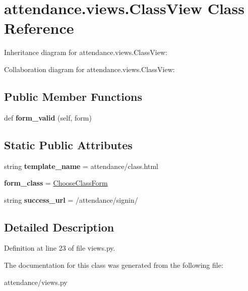 \hypertarget{classattendance_1_1views_1_1_class_view}{}\section{attendance.\+views.\+Class\+View Class Reference}
\label{classattendance_1_1views_1_1_class_view}


Inheritance diagram for attendance.\+views.\+Class\+View\+:


Collaboration diagram for attendance.\+views.\+Class\+View\+:
\subsection*{Public Member Functions}
\begin{DoxyCompactItemize}
\item 
\hypertarget{classattendance_1_1views_1_1_class_view_a7dcd101d6bce0fd6ce5475dedc11401b}{}\label{classattendance_1_1views_1_1_class_view_a7dcd101d6bce0fd6ce5475dedc11401b} 
def {\bfseries form\+\_\+valid} (self, form)
\end{DoxyCompactItemize}
\subsection*{Static Public Attributes}
\begin{DoxyCompactItemize}
\item 
\hypertarget{classattendance_1_1views_1_1_class_view_af00e491db887d7839a67737cf552c3e8}{}\label{classattendance_1_1views_1_1_class_view_af00e491db887d7839a67737cf552c3e8} 
string {\bfseries template\+\_\+name} = \textquotesingle{}attendance/class.\+html\textquotesingle{}
\item 
\hypertarget{classattendance_1_1views_1_1_class_view_a416a1e40d6b0d4e64187bdb7ddc9f7d4}{}\label{classattendance_1_1views_1_1_class_view_a416a1e40d6b0d4e64187bdb7ddc9f7d4} 
{\bfseries form\+\_\+class} = \hyperlink{classattendance_1_1forms_1_1_choose_class_form}{Choose\+Class\+Form}
\item 
\hypertarget{classattendance_1_1views_1_1_class_view_a52a3a1acf86eb413a301aed3f2e2f38b}{}\label{classattendance_1_1views_1_1_class_view_a52a3a1acf86eb413a301aed3f2e2f38b} 
string {\bfseries success\+\_\+url} = \textquotesingle{}/attendance/signin/\textquotesingle{}
\end{DoxyCompactItemize}


\subsection{Detailed Description}


Definition at line 23 of file views.\+py.



The documentation for this class was generated from the following file\+:\begin{DoxyCompactItemize}
\item 
attendance/views.\+py\end{DoxyCompactItemize}
